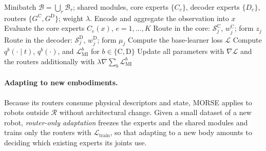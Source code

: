 \begin{algorithm}[t]
\caption{One training step of MORSE}
\label{alg:morse}
\begin{algorithmic}[1]
\Require Minibatch $\mathcal{B}=\bigcup_{r}\mathcal{B}_{r}$; shared modules, core experts $\{C_e\}$, decoder
experts $\{D_e\}$, routers $\{G^{\mathrm{C}},G^{\mathrm{D}}\}$; weight $\lambda$.
  \State Encode and aggregate the observation into $x$ 
  \State Evaluate the core experts $C_e(x)$, $e=1,\dots,K$
    \State Route in the core: $\mathcal{S}^{\mathrm{C}}_j$, $w^{\mathrm{C}}_j$; form $z_j$
    \State Route in the decoder: $\mathcal{S}^{\mathrm{D}}_j$, $w^{\mathrm{D}}_j$; form $\mu_j$
  \EndFor
\EndFor
\State Compute the base-learner loss $\mathcal{L}$ 
\State Compute $q^{b}(\cdot\mid t)$, $q^{b}(\cdot)$, and $\mathcal{L}^{b}_{\mathrm{MI}}$ for $b\in\{\mathrm{C},
\mathrm{D}\}$ 
\State Update all parameters with $\nabla\mathcal{L}$ and the routers additionally with
$\lambda\nabla\sum_b\mathcal{L}^{b}_{\mathrm{MI}}$ 
\end{algorithmic}
\end{algorithm}

\paragraph{Adapting to new embodiments.}
Because its routers consume physical descriptors and state, MORSE applies to robots outside $\mathcal{R}$ without
architectural change. Given a small dataset of a new robot, \emph{router-only adaptation} freezes the experts and the
shared modules and trains only the routers with $\mathcal{L}_{\mathrm{train}}$, so that adapting to a new body amounts
to deciding which existing experts its joints use.

